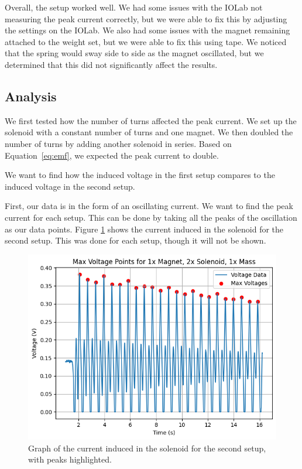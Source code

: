 \documentclass[11pt]{article}
\begin{document}
    Overall, the setup worked well.
    We had some issues with the IOLab not measuring the peak current correctly, but we were able to fix this by adjusting the settings on the IOLab.
    We also had some issues with the magnet remaining attached to the weight set, but we were able to fix this using tape.
    We noticed that the spring would sway side to side as the magnet oscillated, but we determined that this did not significantly affect the results.

    \subsection{Analysis}\label{subsec:part_1_analsysis}

    We first tested how the number of turns affected the peak current.
    We set up the solenoid with a constant number of turns and one magnet.
    We then doubled the number of turns by adding another solenoid in series.
    Based on Equation~\ref{eq:emf}, we expected the peak current to double.

    We want to find how the induced voltage in the first setup compares to the induced voltage in the second setup.

    First, our data is in the form of an oscillating current.
    We want to find the peak current for each setup.
    This can be done by taking all the peaks of the oscillation as our data points.
    Figure \ref{fig:part1_peak_points} shows the current induced in the solenoid for the second setup.
    This was done for each setup, though it will not be shown.

    \begin{figure}[H]
        \centering
        \includegraphics[width=0.8\linewidth]{resources/images/part1 peak points}
        \caption{Graph of the current induced in the solenoid for the second setup, with peaks highlighted.}
        \label{fig:part1_peak_points}
    \end{figure}
\end{document}
